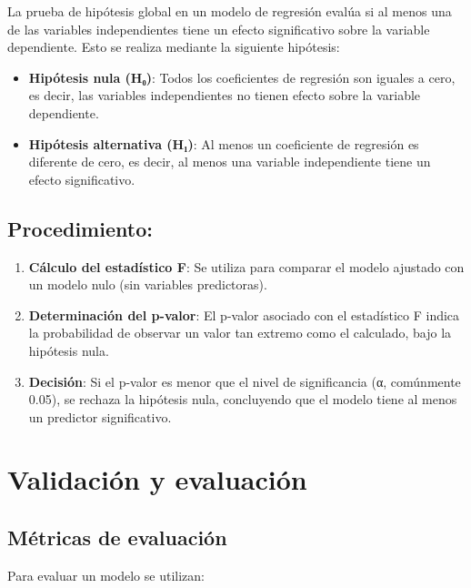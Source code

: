 \documentclass[
  letterpaper,
  DIV=11,
  numbers=noendperiod]{scrreprt}
\providecommand{\tightlist}{%
  \setlength{\itemsep}{0pt}\setlength{\parskip}{0pt}}\usepackage{longtable,booktabs,array}
\begin{document}
La prueba de hipótesis global en un modelo de regresión evalúa si al
menos una de las variables independientes tiene un efecto significativo
sobre la variable dependiente. Esto se realiza mediante la siguiente
hipótesis:

\begin{itemize}
\item
  \textbf{Hipótesis nula (H₀)}: Todos los coeficientes de regresión son
  iguales a cero, es decir, las variables independientes no tienen
  efecto sobre la variable dependiente.
\item
  \textbf{Hipótesis alternativa (H₁)}: Al menos un coeficiente de
  regresión es diferente de cero, es decir, al menos una variable
  independiente tiene un efecto significativo.
\end{itemize}

\subsection{Procedimiento:}\label{procedimiento}

\begin{enumerate}
\def\labelenumi{\arabic{enumi}.}
\tightlist
\item
  \textbf{Cálculo del estadístico F}: Se utiliza para comparar el modelo
  ajustado con un modelo nulo (sin variables predictoras).
\item
  \textbf{Determinación del p-valor}: El p-valor asociado con el
  estadístico F indica la probabilidad de observar un valor tan extremo
  como el calculado, bajo la hipótesis nula.
\item
  \textbf{Decisión}: Si el p-valor es menor que el nivel de
  significancia (α, comúnmente 0.05), se rechaza la hipótesis nula,
  concluyendo que el modelo tiene al menos un predictor significativo.
\end{enumerate}

\section{Validación y evaluación}\label{validaciuxf3n-y-evaluaciuxf3n}

\subsection{Métricas de evaluación}\label{muxe9tricas-de-evaluaciuxf3n}

Para evaluar un modelo se utilizan:
\end{document}
